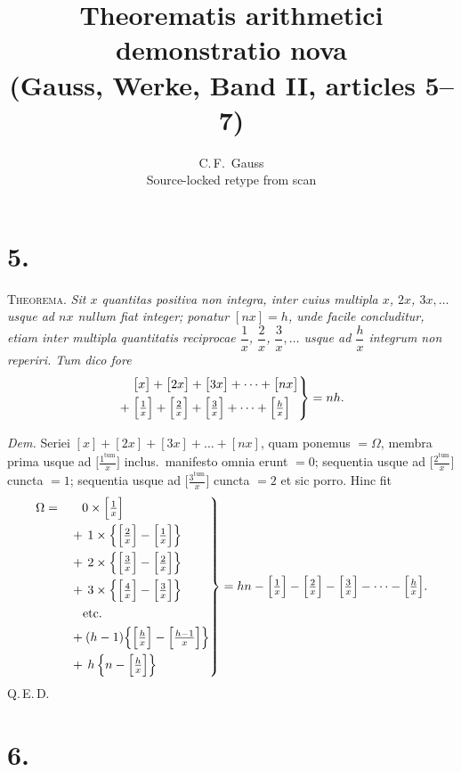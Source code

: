 \documentclass[11pt]{article}
\title{Theorematis arithmetici demonstratio nova\\[2pt]
\large (Gauss, Werke, Band II, articles 5--7)}
\author{C.\,F.\ Gauss\\[2pt]\normalsize Source-locked retype from scan}
\date{}
\begin{document}
\maketitle

\section*{5.}

\textsc{Theorema.} \emph{Sit $x$ quantitas positiva non integra, inter cuius
multipla $x$, $2x$, $3x,\dots$ usque ad $nx$ nullum fiat integer; ponatur
$[nx]=h$, unde facile concluditur, etiam inter multipla quantitatis reciprocae
$\dfrac{1}{x}$, $\dfrac{2}{x}$, $\dfrac{3}{x},\dots$ usque ad $\dfrac{h}{x}$
integrum non reperiri. Tum dico fore}
\[
  \left.
  \begin{aligned}
  &\bigl[x\bigr]+\bigl[2x\bigr]+\bigl[3x\bigr]+\dots+\bigl[nx\bigr]\\
  +\;&\Bigl[\tfrac{1}{x}\Bigr]+\Bigl[\tfrac{2}{x}\Bigr]+\Bigl[\tfrac{3}{x}\Bigr]
       +\dots+\Bigl[\tfrac{h}{x}\Bigr]
  \end{aligned}
  \right\}=nh.
\]

\medskip
\emph{Dem.} Seriei $[x]+[2x]+[3x]+\dots+[nx]$, quam ponemus $=\Omega$, membra
prima usque ad $\bigl[\tfrac{1^{\text{tum}}}{x}\bigr]$ inclus.\ manifesto omnia
erunt $=0$; sequentia usque ad $\bigl[\tfrac{2^{\text{tum}}}{x}\bigr]$ cuncta
$=1$; sequentia usque ad $\bigl[\tfrac{3^{\text{tum}}}{x}\bigr]$ cuncta $=2$
et sic porro. Hinc fit
\[
  \left.
  \begin{aligned}
  \Omega=\quad &\phantom{+\,}0\times\Bigl[\tfrac{1}{x}\Bigr]\\
  &+\,1\times\Bigl\{\Bigl[\tfrac{2}{x}\Bigr]-\Bigl[\tfrac{1}{x}\Bigr]\Bigr\}\\
  &+\,2\times\Bigl\{\Bigl[\tfrac{3}{x}\Bigr]-\Bigl[\tfrac{2}{x}\Bigr]\Bigr\}\\
  &+\,3\times\Bigl\{\Bigl[\tfrac{4}{x}\Bigr]-\Bigl[\tfrac{3}{x}\Bigr]\Bigr\}\\
  &\quad\text{etc.}\\
  &+(h-1)\Bigl\{\Bigl[\tfrac{h}{x}\Bigr]-\Bigl[\tfrac{h-1}{x}\Bigr]\Bigr\}\\
  &+\,h\,\Bigl\{n-\Bigl[\tfrac{h}{x}\Bigr]\Bigr\}
  \end{aligned}
  \right\}
  = hn-\Bigl[\tfrac{1}{x}\Bigr]-\Bigl[\tfrac{2}{x}\Bigr]-\Bigl[\tfrac{3}{x}\Bigr]
        -\dots-\Bigl[\tfrac{h}{x}\Bigr].
\]
\textsc{Q.\,E.\,D.}

\section*{6.}
\end{document}
